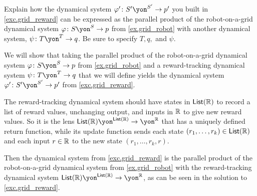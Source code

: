 \documentclass[Book-Poly]{subfiles}
\begin{document}
\begin{exercise} \label{exc.grid_reward_par}
Explain how the dynamical system $\varphi'\colon S'\yon^{S'}\to p'$ you built in \cref{exc.grid_reward} can be expressed as the parallel product of the robot-on-a-grid dynamical system $\varphi\colon S\yon^S\to p$ from \cref{ex.grid_robot} with another dynamical system, $\psi\colon T\yon^T\to q$.
Be sure to specify $T, q,$ and $\psi$.
\begin{solution}
We will show that taking the parallel product of the robot-on-a-grid dynamical system $\varphi\colon S\yon^S\to p$ from \cref{ex.grid_robot} and a reward-tracking dynamical system $\psi\colon T\yon^T\to q$ that we will define yields the dynamical system $\varphi'\colon S'\yon^{S'}\to p'$ from \cref{exc.grid_reward}.

The reward-tracking dynamical system should have states in $\mathsf{List}(\mathbb{R})$ to record a list of reward values, unchanging output, and inputs in $\mathbb{R}$ to give new reward values.
So it is the lens $\lst(\rr)\yon^{\lst(\rr)}\to\yon^\rr$ that has a uniquely defined return function, while its update function sends each state $(r_1,\ldots,r_k)\in\mathsf{List}(\mathbb{R})$ and each input $r\in\mathbb{R}$ to the new state $(r_1,\ldots,r_k,r)$.

Then the dynamical system from \cref{exc.grid_reward} is the parallel product of the robot-on-a-grid dynamical system from \cref{ex.grid_robot} with the reward-tracking dynamical system $\lst(\rr)\yon^{\lst(\rr)}\to\yon^\rr$, as can be seen in the solution to \cref{exc.grid_reward}.
\end{solution}
\end{exercise}
\end{document}
